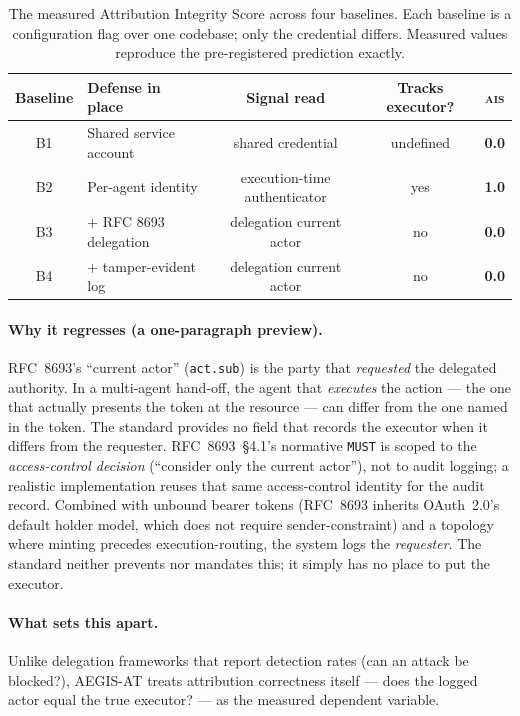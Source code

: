 \documentclass[11pt]{article}
\newcommand{\ais}{\textsc{ais}}
\newcommand{\code}[1]{\texttt{#1}}
\newcommand{\actsub}{\code{act.sub}}
\begin{document}
\begin{table}[h]
\centering
\caption{The measured Attribution Integrity Score across four baselines. Each
baseline is a configuration flag over one codebase; only the credential differs.
Measured values reproduce the pre-registered prediction exactly.}
\label{tab:curve}
\begin{tabular}{clccc}
\toprule
\textbf{Baseline} & \textbf{Defense in place} & \textbf{Signal read} &
\textbf{Tracks executor?} & \textbf{\ais{}} \\
\midrule
B1 & Shared service account        & shared credential          & undefined & \textbf{0.0} \\
B2 & Per-agent identity            & execution-time authenticator & yes     & \textbf{1.0} \\
B3 & + RFC 8693 delegation         & delegation current actor   & no        & \textbf{0.0} \\
B4 & + tamper-evident log          & delegation current actor   & no        & \textbf{0.0} \\
\bottomrule
\end{tabular}
\end{table}

\paragraph{Why it regresses (a one-paragraph preview).}
RFC~8693's ``current actor'' (\actsub{}) is the party that \emph{requested} the
delegated authority. In a multi-agent hand-off, the agent that \emph{executes}
the action --- the one that actually presents the token at the resource --- can
differ from the one named in the token. The standard provides no field that
records the executor when it differs from the requester. RFC~8693~\S4.1's
normative \code{MUST} is scoped to the \emph{access-control decision} (``consider
only the current actor''), not to audit logging; a realistic implementation
reuses that same access-control identity for the audit record. Combined with
unbound bearer tokens (RFC~8693 inherits OAuth~2.0's default holder model, which
does not require sender-constraint) and a topology where minting precedes
execution-routing, the system logs the \emph{requester}. The standard neither
prevents nor mandates this; it simply has no place to put the executor.

\paragraph{What sets this apart.}
Unlike delegation frameworks that report detection rates (can an attack be
blocked?), AEGIS-AT treats attribution correctness itself --- does the logged
actor equal the true executor? --- as the measured dependent variable.
\end{document}
